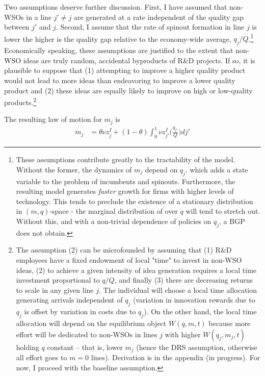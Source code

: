 \documentclass[12pt,english]{article}
\theoremstyle{remark}
\begin{document}
Two assumptions deserve further discussion. First, I have assumed that non-WSOs in a line $j' \ne j$ are generated at a rate independent of the quality gap between $j'$ and $j$. Second, I assume that the rate of spinout formation in line $j$ is lower the higher is the quality gap relative to the economy-wide average, $q_j/Q$.\footnote{These assumptions contribute greatly to the tractability of the model. Without the former, the dynamics of $m_j$ depend on $q_j$. which adds a state variable to the problem of incumbents and spinouts. Furthermore, the resulting model generates \textit{faster} growth for firms with higher levels of technology. This tends to preclude the existence of a stationary distribution in $(m,q)$-space - the marginal distribution of over $q$ will tend to stretch out. Without this, and with a non-trivial dependence of policies on $q_j$, a BGP does not obtain.} Economically speaking, these assumptions are justified to the extent that non-WSO ideas are truly random, accidental byproducts of R\&D projects. If so, it is plausible to suppose that (1) attempting to improve a higher quality product would not lead to more ideas than endeavoring to improve a lower quality product and (2) these ideas are equally likely to improve on high or low-quality products.\footnote{The assumption (2) can be microfounded by assuming that (1) R\&D employees have a fixed endowment of local "time" to invest in non-WSO ideas, (2) to achieve a given intensity of idea generation requires a local time investment proportional to $q/Q$, and finally (3) there are decreasing returns to scale in any given line $j$. The individual will choose a local time allocation generating arrivals independent of $q_j$ (variation in innovation rewards due to $q_j$ is offset by variation in costs due to $q_j$). On the other hand, the local time allocation will depend on the equilibrium object $W(q,m,t)$ because more effort will be dedicated to non-WSOs in lines $j$ with higher $W(q_j,m_j,t)$ holding $q$ constant -- that is, lower $m_j$ (hence the DRS assumption, otherwise all effort goes to $m = 0$ lines). Derivation is in the appendix (in progress). For now, I proceed with the baseline assumption.}


The resulting law of motion for $m_j$ is 
\begin{align}
\dot{m}_j &= \theta \nu z^I_j + (1-\theta) \int_0^1 \nu z^I_{j'} \Big(\frac{q_{j'}}{Q} \Big)dj' \label{m_law_of_motion}
\end{align}
\end{document}

